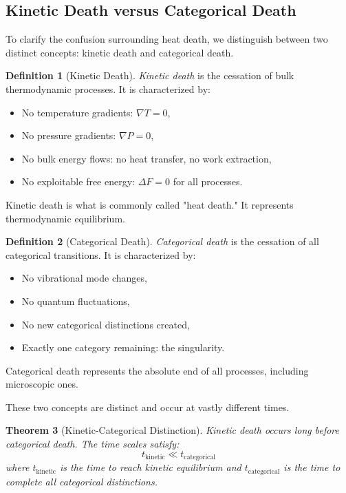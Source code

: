 \documentclass[12pt,a4paper]{article}
\newtheorem{theorem}{Theorem}[section]
\theoremstyle{definition}
\newtheorem{definition}[theorem]{Definition}
\theoremstyle{remark}
\begin{document}
\subsection{Kinetic Death versus Categorical Death}

To clarify the confusion surrounding heat death, we distinguish between two distinct concepts: kinetic death and categorical death.

\begin{definition}[Kinetic Death]
\label{def:kinetic_death}
\emph{Kinetic death} is the cessation of bulk thermodynamic processes. It is characterized by:
\begin{itemize}
    \item No temperature gradients: $\nabla T = 0$,
    \item No pressure gradients: $\nabla P = 0$,
    \item No bulk energy flows: no heat transfer, no work extraction,
    \item No exploitable free energy: $\Delta F = 0$ for all processes.
\end{itemize}
Kinetic death is what is commonly called "heat death." It represents thermodynamic equilibrium.
\end{definition}

\begin{definition}[Categorical Death]
\label{def:categorical_death}
\emph{Categorical death} is the cessation of all categorical transitions. It is characterized by:
\begin{itemize}
    \item No vibrational mode changes,
    \item No quantum fluctuations,
    \item No new categorical distinctions created,
    \item Exactly one category remaining: the singularity.
\end{itemize}
Categorical death represents the absolute end of all processes, including microscopic ones.
\end{definition}

These two concepts are distinct and occur at vastly different times.

\begin{theorem}[Kinetic-Categorical Distinction]
\label{thm:kinetic_categorical}
Kinetic death occurs long before categorical death. The time scales satisfy:
\begin{equation}
t_{\text{kinetic}} \ll t_{\text{categorical}}
\end{equation}
where $t_{\text{kinetic}}$ is the time to reach kinetic equilibrium and $t_{\text{categorical}}$ is the time to complete all categorical distinctions.
\end{theorem}
\end{document}
